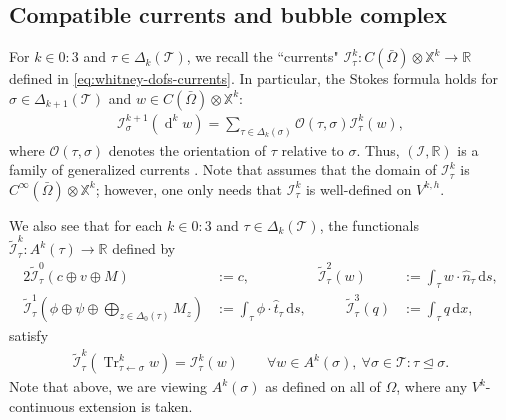 \documentclass{mcom-l}
\theoremstyle{definition}
\theoremstyle{remark}
\numberwithin{equation}{section}
\newcommand{\unitvec}[1]{\hat{#1}}
\renewcommand{\d}[1]{\,\mathrm{d}{#1}}
\DeclareMathOperator{\dee}{d}
\DeclareMathOperator{\from}{\leftarrow}
\DeclareMathOperator{\Tr}{Tr}
\DeclareMathOperator{\subsimplex}{\unlhd}
\newcommand{\mesh}[0]{\mathcal{T}}
\begin{document}
\subsection{Compatible currents and bubble complex}

For $k \in 0:3$ and $\tau \in \Delta_k(\mesh)$, 
we recall the  ``currents"  
$\mathcal{I}_{\tau}^k : C(\bar{\Omega}) \otimes \mathbb{X}^k \to \mathbb{R}$
defined in \cref{eq:whitney-dofs-currents}.
In particular, the Stokes formula holds for 
$\sigma \in \Delta_{k+1}(\mesh)$ and 
$w \in C(\bar{\Omega}) \otimes \mathbb{X}^k$:
\begin{align}
	\label{eq:currents-stokes-thm}
	\mathcal{I}^{k+1}_{\sigma}(\dee^k w) 
	= \sum_{\tau \in \Delta_{k}(\sigma)} \mathcal{O}(\tau, \sigma) 
	\mathcal{I}^{k}_{\tau}(w),
\end{align}
where $\mathcal{O}(\tau, \sigma)$ denotes the orientation of $\tau$ relative 
to $\sigma$. Thus, $(\mathcal{I}, \mathbb{R})$ is a family of generalized 
currents \cite[Definition 2.5]{HuLiangLin25}. Note that \cite{HuLiangLin25}
assumes that the domain of $\mathcal{I}_{\tau}^k$ is
$C^{\infty}(\bar{\Omega}) \otimes \mathbb{X}^k$; however, one only needs that 
$\mathcal{I}^k_{\tau}$ is well-defined on $V^{k, h}$.

We also see that for each $k \in 0:3$ and 
$\tau \in \Delta_k(\mesh)$, the functionals
${\tilde{\mathcal{I}}_{\tau}^k : A^k(\tau) \to \mathbb{R}}$ defined by 
\begin{alignat*}{2}
	\tilde{\mathcal{I}}^0_{\tau} ( c \oplus v \oplus M ) &:= c, 
	\qquad & \tilde{\mathcal{I}}^2_{\tau} (w) &:= 
	\int_{\tau} w \cdot \unitvec{n}_{\tau} \d{s}, \\
	\tilde{\mathcal{I}}^1_{\tau} \left(\phi \oplus \psi \oplus
	\bigoplus_{z \in \Delta_0(\tau)} M_z \right) &:= 
	\int_{\tau} \phi \cdot \unitvec{t}_{\tau} \d{s}, 
	& \qquad
	\tilde{\mathcal{I}}^3_{\tau} (q) &:= \int_{\tau} q \d{x},
\end{alignat*}
satisfy
\begin{align}
	\label{eq:current-trace-compatibility}
	\tilde{\mathcal{I}}_{\tau}^k( \Tr^k_{\tau \from \sigma} w) = 
	\mathcal{I}_{\tau}^k(w) \qquad \forall w \in A^{k}(\sigma),
	\ \forall \sigma \in \mesh : \tau \subsimplex \sigma.
\end{align}
Note that above, we are viewing $A^k(\sigma)$ as defined on all of $\Omega$,
where any $V^{k}$-continuous extension is taken.
\end{document}
